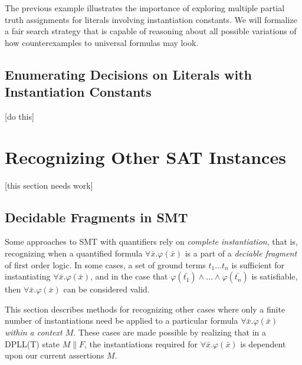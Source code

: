 \documentclass{llncs}
\begin{document}
The previous example illustrates the importance of exploring multiple partial truth assignments for literals involving instantiation constants.
We will formalize a fair search strategy that is capable of reasoning about all possible variations of how counterexamples to universal formulas may look.

\subsection{Enumerating Decisions on Literals with Instantiation Constants}

[do this]

\section{Recognizing Other SAT Instances}

[this section needs work]

\subsection{Decidable Fragments in SMT}

Some approaches to SMT with quantifiers rely on \emph{complete instantiation}, that is, recognizing when a quantified formula $\forall \bar{ x }. \varphi( \bar{ x } )$ is a part of a \emph{deciable fragment} of first order logic.
In some cases, a set of ground terms $t_1 \ldots t_n$ is sufficient for instantiating $\forall \bar{ x }. \varphi( \bar{ x } )$, and in the case that $\varphi( \bar{ t_1 } ) \wedge \ldots \wedge \varphi( \bar{ t_n } )$ is satisfiable, then $\forall \bar{ x }. \varphi( \bar{ x } )$ can be considered valid.

This section describes methods for recognizing other cases where only a finite number of instantiations need be applied to a particular formula $\forall \bar{ x }. \varphi( \bar{ x } )$ \emph{within a context $M$}.
These cases are made possible by realizing that in a DPLL(T) state $M \parallel F$, the instantiations required for $\forall \bar{ x }. \varphi( \bar{ x } )$ is dependent upon our current assertions $M$.

\end{document}
